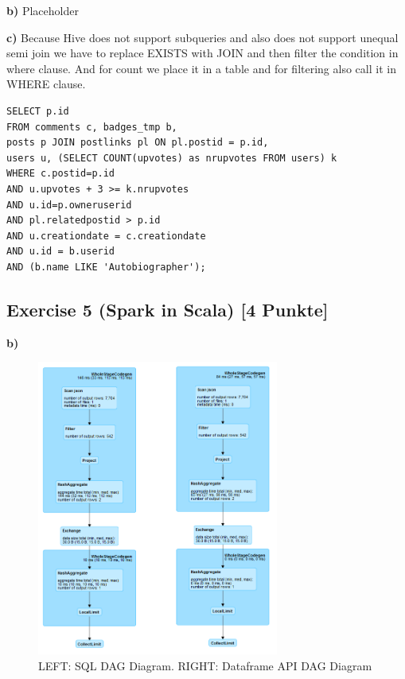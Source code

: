 \documentclass[]{article}
\begin{document}
\textbf{b)} Placeholder

\textbf{c)} Because Hive does not support subqueries and also does not
support unequal semi join we have to replace EXISTS with JOIN and then
filter the condition in where clause. And for count we place it in a
table and for filtering also call it in WHERE clause.

\begin{verbatim}
SELECT p.id
FROM comments c, badges_tmp b, 
posts p JOIN postlinks pl ON pl.postid = p.id,
users u, (SELECT COUNT(upvotes) as nrupvotes FROM users) k
WHERE c.postid=p.id 
AND u.upvotes + 3 >= k.nrupvotes
AND u.id=p.owneruserid 
AND pl.relatedpostid > p.id
AND u.creationdate = c.creationdate  
AND u.id = b.userid 
AND (b.name LIKE 'Autobiographer');
\end{verbatim}

\newpage

\hypertarget{exercise-5-spark-in-scala-4-punkte}{%
\subsection{Exercise 5 (Spark in Scala) {[}4
Punkte{]}}\label{exercise-5-spark-in-scala-4-punkte}}

\textbf{b)}

\begin{figure}[h]

{\centering \includegraphics[width=300px]{images/query1} 

}

\caption{\label{fig:figs}LEFT: SQL DAG Diagram. RIGHT: Dataframe API DAG Diagram}\label{fig:unnamed-chunk-6}
\end{figure}
\end{document}
